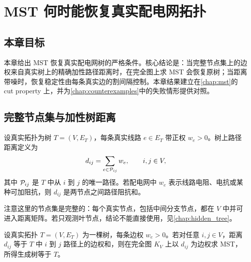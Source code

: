 \chapter{MST 何时能恢复真实配电网拓扑}
\label{chap:mst_recovery}

\section*{本章目标}
本章给出 MST 恢复真实配电网树的严格条件。核心结论是：当完整节点集上的边权来自真实树上的精确加性路径距离时，在完全图上求 MST 会恢复原树；当距离带噪时，恢复稳定性由每条真实边的割间隔控制。本章结果建立在\cref{chap:mst}的 cut property 上，并为\cref{chap:counterexamples}中的失败情形提供对照。

\section{完整节点集与加性树距离}

设真实拓扑为树 $T=(V,E_T)$，每条真实线路 $e\in E_T$ 带正权 $w_e>0$。树上路径距离定义为
\begin{equation}
  d_{ij}=\sum_{e\in \mathcal{P}_{ij}} w_e,\qquad i,j\in V,
  \label{eq:additive_distance}
\end{equation}
其中 $\mathcal{P}_{ij}$ 是 $T$ 中从 $i$ 到 $j$ 的唯一路径。若配电网中 $w_e$ 表示线路电阻、电抗或某种可加阻抗，则 $d_{ij}$ 是两节点之间路径阻抗和。

注意这里的节点集是完整的：每个真实节点，包括中间分支节点，都在 $V$ 中并可进入距离矩阵。若只观测叶节点，结论不能直接使用，见\cref{chap:hidden_tree}。

\begin{theorem}
\label{thm:additive_mst_recovery}
设真实拓扑 $T=(V,E_T)$ 为一棵树，每条边权 $w_e>0$。若对任意 $i,j\in V$，距离 $d_{ij}$ 等于 $T$ 中 $i$ 到 $j$ 路径上的边权和，则在完全图 $K_V$ 上以 $d_{ij}$ 为边权求 MST，所得生成树等于 $T$。
\end{theorem}

